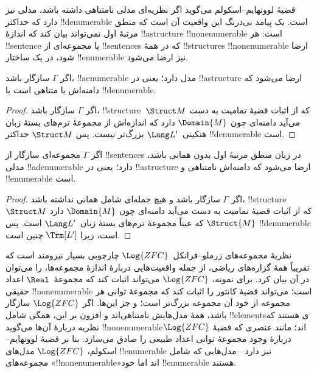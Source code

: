 \documentclass[../../../include/open-logic-section]{subfiles}
\begin{document}

قضیهٔ لوونهایم--اسکولم می‌گوید اگر نظریه‌ای مدلی نامتناهی داشته باشد،
مدلی نیز دارد که حداکثر !!{denumerable} است. یک پیامد بی‌درنگ این واقعیت
آن است که منطق مرتبهٔ اول نمی‌تواند بیان کند که اندازهٔ !!a{structure}
!!{nonenumerable} است: هر !!{sentence} یا مجموعه‌ای از !!{sentence}s که
در همهٔ !!{structure}s !!{nonenumerable} ارضا شود، در یک ساختار
!!{enumerable} نیز ارضا می‌شود.

\begin{thm}
 اگر $\Gamma$ سازگار باشد، !!a{enumerable}
مدل دارد؛ یعنی در !!a{structure} ارضا می‌شود که دامنه‌اش یا متناهی است
یا !!{denumerable}.
\end{thm}

\begin{proof}
اگر $\Gamma$ سازگار باشد، !!{structure}~$\Struct M$ که از اثبات قضیهٔ
تمامیت به دست می‌آید دامنه‌ای چون $\Domain{M}$ دارد که اندازه‌اش از
مجموعهٔ ترم‌های بستهٔ زبان هنکینی~$\Lang L'$ بزرگ‌تر نیست. پس
$\Struct M$ حداکثر !!{denumerable} است.
\end{proof}

\begin{thm}
 اگر $\Gamma$ مجموعه‌ای سازگار از !!{sentence}s
در زبان منطق مرتبهٔ اول بدون همانی باشد، مدلی !!a{denumerable} دارد؛
یعنی در !!a{structure} ارضا می‌شود که دامنه‌اش نامتناهی و
!!{enumerable} است.
\end{thm}

\begin{proof}
اگر $\Gamma$ سازگار باشد و هیچ جمله‌ای شامل همانی نداشته باشد،
!!{structure}~$\Struct M$ که از اثبات قضیهٔ تمامیت به دست می‌آید دامنه‌ای
چون $\Domain{M}$ دارد که عیناً مجموعهٔ ترم‌های بستهٔ زبان~$\Lang L'$
است. پس $\Struct{M}$ !!{denumerable} است، زیرا $\Trm[L']$ چنین است.
\end{proof}

\begin{ex}
نظریهٔ مجموعه‌های زرملو--فرانکل~$\Log{ZFC}$ چارچوبی بسیار نیرومند است
که تقریباً همهٔ گزاره‌های ریاضی، از جمله واقعیت‌هایی دربارهٔ اندازهٔ
مجموعه‌ها، را می‌توان در آن بیان کرد. برای نمونه، $\Log{ZFC}$ می‌تواند
اثبات کند که مجموعهٔ~$\Real$ اعداد حقیقی !!{nonenumerable} است؛ می‌تواند
قضیهٔ کانتور را اثبات کند که مجموعهٔ توانی هر مجموعه از خود آن مجموعه
بزرگ‌تر است؛ و جز این‌ها. اگر $\Log{ZFC}$ سازگار باشد، همهٔ مدل‌هایش
نامتناهی‌اند و افزون بر این، همگی شامل !!{element}sی هستند که نظریه
دربارهٔ آن‌ها می‌گوید !!{nonenumerable}اند؛ مانند عنصری که قضیهٔ
$\Log{ZFC}$ دربارهٔ وجود مجموعهٔ توانی اعداد طبیعی را صادق می‌سازد.
بنا بر قضیهٔ لوونهایم--اسکولم، $\Log{ZFC}$ مدل‌های !!{enumerable} نیز
دارد---مدل‌هایی که شامل مجموعه‌های «!!{nonenumerable}»اند اما خود
!!{enumerable} هستند.
\end{ex}
\end{document}
